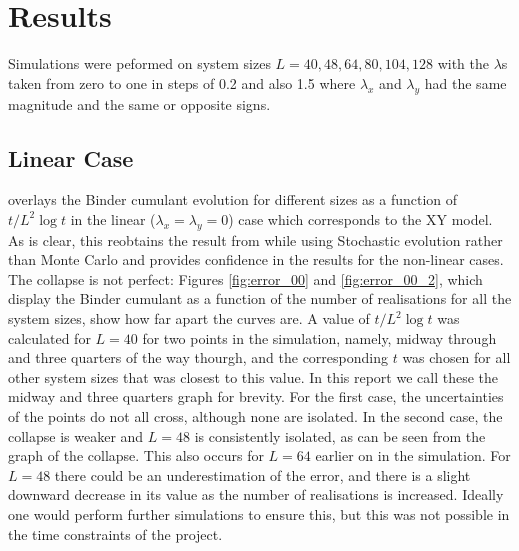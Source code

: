\chapter{Results}

Simulations were peformed on system sizes $L=40, 48, 64, 80, 104, 128$ with the $\lambda$s taken from zero to one in steps of 0.2 and also 1.5 where $\lambda_x$ and $\lambda_y$ had the same magnitude and the same or opposite signs. 

\section{Linear Case}

\fig{\ref{fig:binder_logt_zerozero}} overlays the Binder cumulant evolution for different sizes as a function of $t/L^2\log t$ in the linear ($\lambda_x = \lambda_y = 0$) case which corresponds to the XY model.  
As is clear, this reobtains the result from \cite{PhysRevLett.84.1503} while using Stochastic evolution rather than Monte Carlo and provides confidence in the results for the non-linear cases. 
The collapse is not perfect: Figures \ref{fig:error_00} and \ref{fig:error_00_2}, which display the Binder cumulant as a function of the number of realisations for all the system sizes, show how far apart the curves are. A value of $t /L^2 \log t$ was calculated for $L=40$ for two points in the simulation, namely, midway through and three quarters of the way thourgh, and the corresponding $t$ was chosen for all other system sizes that was closest to this value. In this report we call these the midway and three quarters graph for brevity. 
For the first case, the uncertainties of the points do not all cross, although none are isolated. 
In the second case, the collapse is weaker and $L=48$ is consistently isolated, as can be seen from the graph of the collapse. 
This also occurs for $L=64$ earlier on in the simulation. 
For $L=48$ there could be an underestimation of the error, and there is a slight downward decrease in its value as the number of realisations is increased. 
Ideally one would perform further simulations to ensure this, but this was not possible in the time constraints of the project. 

